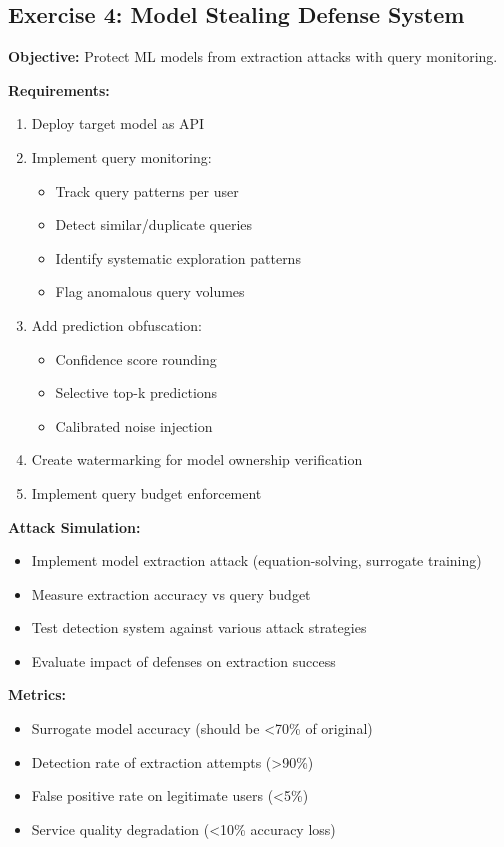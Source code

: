 \subsection{Exercise 4: Model Stealing Defense System}

\textbf{Objective:} Protect ML models from extraction attacks with query monitoring.

\textbf{Requirements:}
\begin{enumerate}
    \item Deploy target model as API
    \item Implement query monitoring:
    \begin{itemize}
        \item Track query patterns per user
        \item Detect similar/duplicate queries
        \item Identify systematic exploration patterns
        \item Flag anomalous query volumes
    \end{itemize}
    \item Add prediction obfuscation:
    \begin{itemize}
        \item Confidence score rounding
        \item Selective top-k predictions
        \item Calibrated noise injection
    \end{itemize}
    \item Create watermarking for model ownership verification
    \item Implement query budget enforcement
\end{enumerate}

\textbf{Attack Simulation:}
\begin{itemize}
    \item Implement model extraction attack (equation-solving, surrogate training)
    \item Measure extraction accuracy vs query budget
    \item Test detection system against various attack strategies
    \item Evaluate impact of defenses on extraction success
\end{itemize}

\textbf{Metrics:}
\begin{itemize}
    \item Surrogate model accuracy (should be <70\% of original)
    \item Detection rate of extraction attempts (>90\%)
    \item False positive rate on legitimate users (<5\%)
    \item Service quality degradation (<10\% accuracy loss)
\end{itemize}

